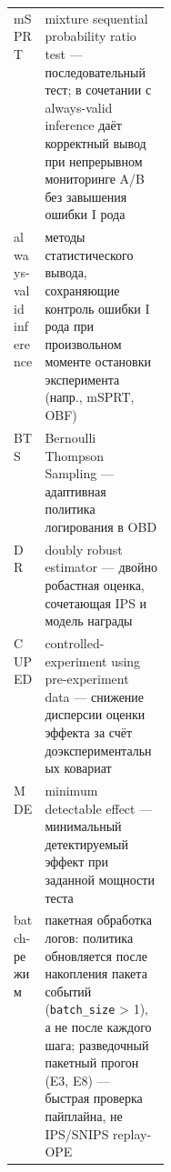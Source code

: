 \begin{tabularx}{\linewidth}{@{}>{\raggedright\arraybackslash}p{0.20\linewidth}>{\raggedright\arraybackslash}X@{}}
mSPRT & mixture sequential probability ratio test --- последовательный тест; в сочетании с always-valid inference даёт корректный вывод при непрерывном мониторинге A/B без завышения ошибки I рода \\
always-valid inference & методы статистического вывода, сохраняющие контроль ошибки I рода при произвольном моменте остановки эксперимента (напр., mSPRT, OBF) \\
BTS & Bernoulli Thompson Sampling --- адаптивная политика логирования в OBD \\
DR & doubly robust estimator --- двойно робастная оценка, сочетающая IPS и модель награды \\
CUPED & controlled-experiment using pre-experiment data --- снижение дисперсии оценки эффекта за счёт доэкспериментальных ковариат \\
MDE & minimum detectable effect --- минимальный детектируемый эффект при заданной мощности теста \\
batch-режим & пакетная обработка логов: политика обновляется после накопления пакета событий (\texttt{batch\_size} > 1), а не после каждого шага; разведочный пакетный прогон (E3, E8) --- быстрая проверка пайплайна, не IPS/SNIPS replay-OPE \\
\bottomrule
\end{tabularx}
\endgroup
